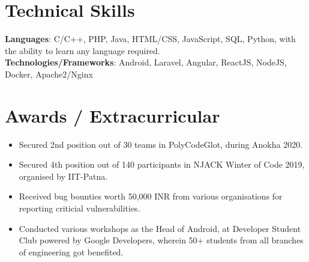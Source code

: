 \documentclass[letterpaper,11pt]{article}
\newcommand{\resumeItem}[1]{
  \item\small{
    {#1 \vspace{-2pt}}
  }
}
\newcommand{\resumeItemListStart}{\begin{itemize}}
\newcommand{\resumeItemListEnd}{\end{itemize}\vspace{-5pt}}
\begin{document}
%
\section{Technical Skills}
 \begin{itemize}[leftmargin=0.15in, label={}]
    \small{\item{
     \textbf{Languages}{: C/C++, PHP, Java, HTML/CSS, JavaScript, SQL, Python, with the ability to learn any language required.} \\
     \textbf{Technologies/Frameworks}{: Android, Laravel, Angular, ReactJS, NodeJS, Docker, Apache2/Nginx} \\
    }}
 \end{itemize}
 \vspace{-16pt}


\section{Awards / Extracurricular}
            \resumeItemListStart
                \resumeItem{Secured 2nd position out of 30 teams in PolyCodeGlot, during Anokha 2020.}\vspace{-5pt}
                \resumeItem{Secured 4th position out of 140 participants in NJACK Winter of Code 2019, organised by IIT-Patna.}\vspace{-5pt}
                \resumeItem{Received bug bounties worth 50,000 INR from various organisations for reporting criticial vulnerabilities.}\vspace{-5pt}
                \resumeItem{Conducted various workshops as the Head of Android, at Developer Student Club powered by Google Developers,  wherein 50+ students from all branches of engineering got benefited.}\vspace{-5pt}
            \resumeItemListEnd
\end{document}
